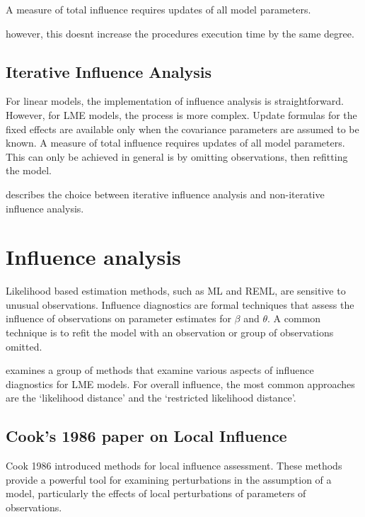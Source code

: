 \documentclass[12pt, a4paper]{article}
\begin{document}
A measure of total influence requires updates of all model parameters.

however, this doesnt increase the procedures execution time by the same degree.
\subsection{Iterative Influence Analysis}

For linear models, the implementation of influence analysis is straightforward.
However, for LME models, the process is more complex. Update formulas for the fixed effects are available only when the covariance parameters are assumed to be known. A measure of total influence requires updates of all model parameters.
This can only be achieved in general is by omitting observations, then refitting the model.

\citet{schabenberger} describes the choice between  iterative influence analysis and  non-iterative influence analysis.

\newpage
\section{Influence analysis} %

Likelihood based estimation methods, such as ML and REML, are sensitive to unusual observations. Influence diagnostics are formal techniques that assess the influence of observations on parameter estimates for $\beta$ and $\theta$. A common technique is to refit the model with an observation or group of observations omitted.

\citet{west} examines a group of methods that examine various aspects of influence diagnostics for LME models.
For overall influence, the most common approaches are the `likelihood distance' and the `restricted likelihood distance'.

\subsection{Cook's 1986 paper on Local Influence}%
Cook 1986 introduced methods for local influence assessment. These methods provide a powerful tool for examining perturbations in the assumption of a model, particularly the effects of local perturbations of parameters of observations.
\end{document}
